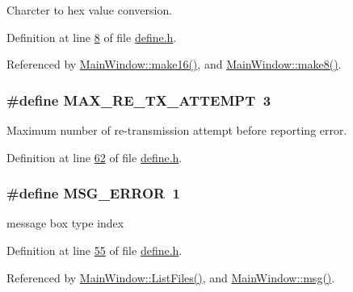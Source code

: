 Charcter to hex value conversion. 



Definition at line \hyperlink{a00090_source_l00008}{8} of file \hyperlink{a00090_source}{define.\+h}.



Referenced by \hyperlink{a00135_source_l00013}{Main\+Window\+::make16()}, and \hyperlink{a00135_source_l00005}{Main\+Window\+::make8()}.

\hypertarget{a00090_ae024113875b4670b57f70611ff982543}{
\subsubsection[{M\+A\+X\+\_\+\+R\+E\+\_\+\+T\+X\+\_\+\+A\+T\+T\+E\+M\+P\+T}]{\setlength{\rightskip}{0pt plus 5cm}\#define M\+A\+X\+\_\+\+R\+E\+\_\+\+T\+X\+\_\+\+A\+T\+T\+E\+M\+P\+T~3}}\label{a00090_ae024113875b4670b57f70611ff982543}


Maximum number of re-\/transmission attempt before reporting error. 



Definition at line \hyperlink{a00090_source_l00062}{62} of file \hyperlink{a00090_source}{define.\+h}.

\hypertarget{a00090_aa8a990825a5a62c89d2fb8b08d8a1070}{
\subsubsection[{M\+S\+G\+\_\+\+E\+R\+R\+O\+R}]{\setlength{\rightskip}{0pt plus 5cm}\#define M\+S\+G\+\_\+\+E\+R\+R\+O\+R~1}}\label{a00090_aa8a990825a5a62c89d2fb8b08d8a1070}


message box type index 



Definition at line \hyperlink{a00090_source_l00055}{55} of file \hyperlink{a00090_source}{define.\+h}.



Referenced by \hyperlink{a00109_source_l00308}{Main\+Window\+::\+List\+Files()}, and \hyperlink{a00109_source_l00145}{Main\+Window\+::msg()}.

